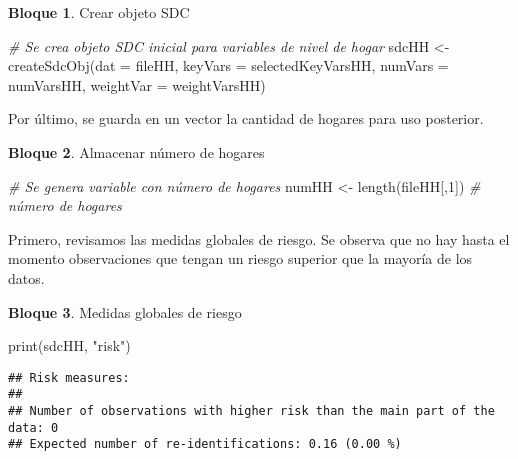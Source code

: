 \documentclass[
]{book}
\newenvironment{Shaded}{\begin{snugshade}}{\end{snugshade}}
\newcommand{\AttributeTok}[1]{\textcolor[rgb]{0.77,0.63,0.00}{#1}}
\newcommand{\CommentTok}[1]{\textcolor[rgb]{0.56,0.35,0.01}{\textit{#1}}}
\newcommand{\DecValTok}[1]{\textcolor[rgb]{0.00,0.00,0.81}{#1}}
\newcommand{\FunctionTok}[1]{\textcolor[rgb]{0.00,0.00,0.00}{#1}}
\newcommand{\NormalTok}[1]{#1}
\newcommand{\OtherTok}[1]{\textcolor[rgb]{0.56,0.35,0.01}{#1}}
\newcommand{\StringTok}[1]{\textcolor[rgb]{0.31,0.60,0.02}{#1}}
\theoremstyle{definition}
\theoremstyle{definition}
\newtheorem{example}{Bloque}[chapter]
\theoremstyle{definition}
\theoremstyle{definition}
\theoremstyle{remark}
\begin{document}
\begin{example}
\protect\hypertarget{exm:bloque43nbm}{}\label{exm:bloque43nbm}Crear objeto SDC
\end{example}

\begin{Shaded}
\begin{Highlighting}[]
\CommentTok{\# Se crea objeto SDC inicial para variables de nivel de hogar}
\NormalTok{sdcHH }\OtherTok{\textless{}{-}} \FunctionTok{createSdcObj}\NormalTok{(}\AttributeTok{dat =}\NormalTok{ fileHH, }\AttributeTok{keyVars =}\NormalTok{ selectedKeyVarsHH,}
                      \AttributeTok{numVars =}\NormalTok{ numVarsHH, }\AttributeTok{weightVar =}\NormalTok{ weightVarsHH)}
\end{Highlighting}
\end{Shaded}

Por último, se guarda en un vector la cantidad de hogares para uso posterior.

\begin{example}
\protect\hypertarget{exm:bloque44nbm}{}\label{exm:bloque44nbm}Almacenar número de hogares
\end{example}

\begin{Shaded}
\begin{Highlighting}[]
\CommentTok{\# Se genera variable con número de hogares}
\NormalTok{numHH }\OtherTok{\textless{}{-}} \FunctionTok{length}\NormalTok{(fileHH[,}\DecValTok{1}\NormalTok{]) }\CommentTok{\# número de hogares }
\end{Highlighting}
\end{Shaded}

Primero, revisamos las medidas globales de riesgo. Se observa que no hay hasta el momento observaciones que tengan un riesgo superior que la mayoría de los datos.

\begin{example}
\protect\hypertarget{exm:bloque45nbm}{}\label{exm:bloque45nbm}Medidas globales de riesgo
\end{example}

\begin{Shaded}
\begin{Highlighting}[]
\FunctionTok{print}\NormalTok{(sdcHH, }\StringTok{"risk"}\NormalTok{)}
\end{Highlighting}
\end{Shaded}

\begin{verbatim}
## Risk measures:
## 
## Number of observations with higher risk than the main part of the data: 0
## Expected number of re-identifications: 0.16 (0.00 %)
\end{verbatim}
\end{document}
